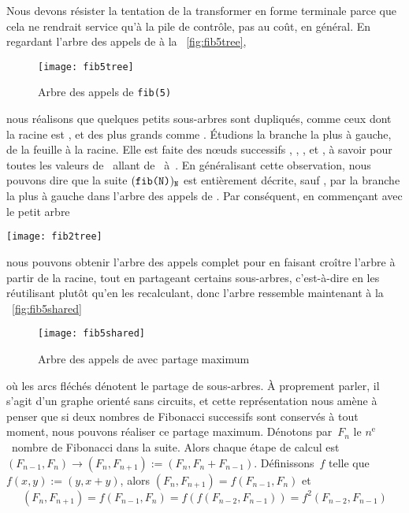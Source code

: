 Nous devons résister la tentation de la transformer en forme terminale
parce que cela ne rendrait service qu'à la pile de contrôle, pas au
coût, en général. En regardant l'arbre des appels de 
à la \fig~\vref{fig:fib5tree},
\begin{figure}[b]
\centering
\texttt{[image: fib5tree]}
\caption{Arbre des appels de \texttt{fib(5)}\label{fig:fib5tree}}
\end{figure}
nous réalisons que quelques petits sous-arbres sont dupliqués, comme
ceux dont la racine est , et des plus grands comme
. Étudions la branche la plus à gauche, de la feuille
à la racine. Elle est faite des n{\oe}uds successifs ,
, ,  et
, à savoir  pour toutes les valeurs
de~ allant de~ à~. En généralisant
cette observation, nous pouvons dire que la suite
\((\texttt{fib(N)})_{\texttt{N}}\) est entièrement décrite, sauf
, par la branche la plus à gauche dans l'arbre des
appels de . Par conséquent, en commençant avec le
petit arbre
\begin{center}
\texttt{[image: fib2tree]}
\end{center}
nous pouvons obtenir l'arbre des appels complet pour 
en faisant croître l'arbre à partir de la racine, tout en partageant
certains sous-arbres, c'est-à-dire en les réutilisant plutôt qu'en les
recalculant, donc l'arbre ressemble maintenant à la
\fig~\vref{fig:fib5shared}
\begin{figure}
\centering
\texttt{[image: fib5shared]}
\caption{Arbre des appels de  avec partage maximum
\label{fig:fib5shared}}
\end{figure}
où les arcs fléchés dénotent le partage de sous-arbres. À proprement
parler, il s'agit d'un graphe orienté sans circuits, et cette
représentation nous amène à penser que si deux nombres de Fibonacci
successifs sont conservés à tout moment, nous pouvons réaliser ce
partage maximum. Dénotons par~\(F_n\) le \(n^\text{e}\)~nombre de
Fibonacci dans la suite. Alors chaque étape de calcul est
\((F_{n-1},F_{n}) \rightarrow (F_{n}, F_{n+1}) :=
(F_{n},F_{n}+F_{n-1})\). Définissons~\(f\) telle que \(f(x,y) :=
(y,x+y)\), alors \((F_{n},F_{n+1}) = f(F_{n-1},F_{n})\) et
\begin{equation*}
(F_n,F_{n+1}) = f(F_{n-1},F_{n}) = f(f(F_{n-2},F_{n-1})) =
f^2(F_{n-2},F_{n-1})
\end{equation*}
